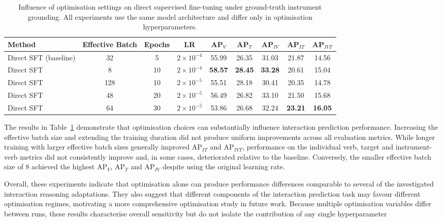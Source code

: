 \documentclass[11pt]{article}
\begin{document}
\begin{table}[t]
\centering
\caption{Influence of optimisation settings on direct supervised fine-tuning under ground-truth instrument grounding. All experiments use the same model architecture and differ only in optimisation hyperparameters.}
\label{tab:optimisation_results}
\begin{tabular}{lccc|ccccc}
\toprule
Method & Effective Batch & Epochs & LR
& AP$_V$ & AP$_T$ & AP$_{IV}$ & AP$_{IT}$ & AP$_{IVT}$ \\
\midrule
Direct SFT (baseline)        & 32  & 5  & $2\times10^{-4}$ & 55.99 & 26.35 & 31.03 & 21.87 & 14.56 \\

Direct SFT                   & 8   & 10 & $2\times10^{-4}$ & \textbf{58.57} & \textbf{28.45} & \textbf{33.28} & 20.61 & 15.04 \\

Direct SFT                   & 128 & 10 & $2\times10^{-5}$ & 55.51 & 28.18 & 30.41 & 20.35 & 14.78 \\

Direct SFT                   & 48  & 20 & $2\times10^{-5}$ & 56.49 & 26.82 & 33.10 & 21.50 & 15.68 \\

Direct SFT                   & 64  & 30 & $2\times10^{-5}$ & 53.86 & 26.68 & 32.24 & \textbf{23.21} & \textbf{16.05} \\


\bottomrule
\end{tabular}
\end{table}

The results in Table~\ref{tab:optimisation_results} demonstrate that optimisation choices can substantially influence interaction prediction performance. Increasing the effective batch size and extending the training duration did not produce uniform improvements across all evaluation metrics. While longer training with larger effective batch sizes generally improved AP$_{IT}$ and AP$_{IVT}$, performance on the individual verb, target and instrument-verb metrics did not consistently improve and, in some cases, deteriorated relative to the baseline. Conversely, the smaller effective batch size of 8 achieved the highest AP$_V$, AP$_T$ and AP$_{IV}$ despite using the original learning rate.

Overall, these experiments indicate that optimisation alone can produce performance differences comparable to several of the investigated interaction reasoning adaptations. They also suggest that different components of the interaction prediction task may favour different optimisation regimes, motivating a more comprehensive optimisation study in future work. Because multiple optimisation variables differ between runs, these results characterise overall sensitivity but do not isolate the contribution of any single hyperparameter
\end{document}

